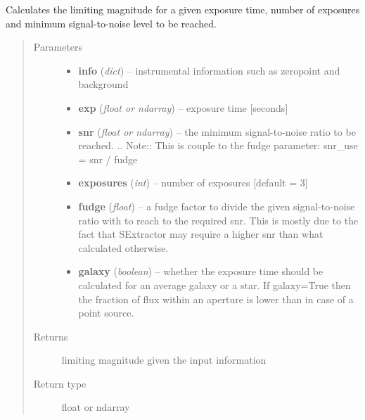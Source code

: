 \documentclass[a4paper,12pt,english]{sphinxmanual}
\begin{document}
\begin{fulllineitems}
\label{ETC:analysis.ETC.limitingMagnitude}
Calculates the limiting magnitude for a given exposure time, number of exposures and minimum signal-to-noise
level to be reached.
\begin{quote}\begin{description}
\item[{Parameters}] \leavevmode\begin{itemize}
\item {} 
\textbf{info} (\emph{dict}) -- instrumental information such as zeropoint and background

\item {} 
\textbf{exp} (\emph{float or ndarray}) -- exposure time {[}seconds{]}

\item {} 
\textbf{snr} (\emph{float or ndarray}) -- the minimum signal-to-noise ratio to be reached.
.. Note:: This is couple to the fudge parameter: snr\_use = snr / fudge

\item {} 
\textbf{exposures} (\emph{int}) -- number of exposures {[}default = 3{]}

\item {} 
\textbf{fudge} (\emph{float}) -- a fudge factor to divide the given signal-to-noise ratio with to reach to the required snr.
This is mostly due to the fact that SExtractor may require a higher snr than what calculated
otherwise.

\item {} 
\textbf{galaxy} (\emph{boolean}) -- whether the exposure time should be calculated for an average galaxy or a star.
If galaxy=True then the fraction of flux within an aperture is lower than in case of a point source.

\end{itemize}

\item[{Returns}] \leavevmode
limiting magnitude given the input information

\item[{Return type}] \leavevmode
float or ndarray

\end{description}\end{quote}

\end{fulllineitems}
\end{document}
